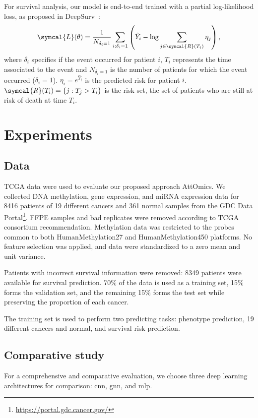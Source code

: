\documentclass[../main.tex]{subfiles}
\begin{document}
		For survival analysis, our model is end-to-end trained with a partial log-likelihood loss, as proposed in DeepSurv~\cite{katzmanDeepSurvPersonalizedTreatment2018}:
		\[ \symcal{L}(\theta) = \frac{1}{N_{\delta_i = 1}} \sum_{i:\delta_i=1} \left(\hat{Y}_i - \log \sum_{j \in \symcal{R}(T_i)}\eta_j \right) \text{,}\]
		where \(\delta_i\) specifies if the event occurred for patient \(i\), \(T_i\) represents the time associated to the event and \(N_{\delta_i = 1}\) is the number of patients for which the event occurred (\(\delta_i = 1\)).
		\(\eta_i = e^{\hat{Y}_i}\) is the predicted risk for patient \(i\).
		\(\symcal{R}(T_i) = \{j: T_j > T_i\}\) is the risk set, the set of patients who are still at risk of death at time \(T_i\).

\section{Experiments}
	\subsection{Data}

		TCGA data were used to evaluate our proposed approach AttOmics.
		We collected DNA methylation, gene expression, and miRNA expression data for 8416 patients of 19 different cancers and 361 normal samples from the GDC Data Portal\footnote{\url{https://portal.gdc.cancer.gov/}}.
		FFPE samples and bad replicates were removed according to TCGA consortium recommendation.
		Methylation data was restricted to the probes common to both HumanMethylation27 and HumanMethylation450 platforms.
		No feature selection was applied, and data were standardized to a zero mean and unit variance.

		Patients with incorrect survival information were removed: 8349 patients were available for survival prediction.
		70\% of the data is used as a training set, 15\% forms the validation set, and the remaining 15\% forms the test set while preserving the proportion of each cancer.

		The training set is used to perform two predicting tasks: phenotype prediction, 19 different cancers and normal, and survival risk prediction.

	\subsection{Comparative study}
		For a comprehensive and comparative evaluation, we choose three deep learning architectures for comparison: \gls{cnn}, \gls{gnn}, and \gls{mlp}.
\end{document}
